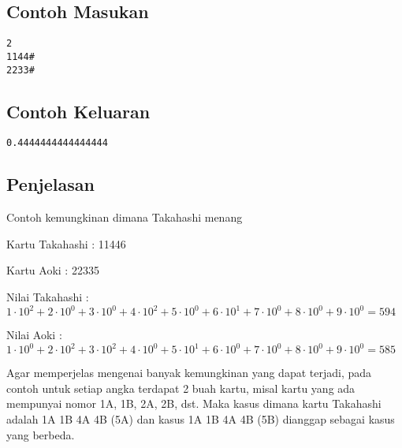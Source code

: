 \documentclass{article}
\begin{document}
\begin{multicols}{2}
\subsection*{Contoh Masukan}
\begin{lstlisting}
2
1144#
2233#
\end{lstlisting}
\columnbreak
\subsection*{Contoh Keluaran}
\begin{lstlisting}
0.4444444444444444
\end{lstlisting}
\vfill
\null
\end{multicols}

\subsection*{Penjelasan}
Contoh kemungkinan dimana Takahashi menang

Kartu Takahashi : 11446

Kartu Aoki : 22335

Nilai Takahashi : $1\cdot 10^2 + 2 \cdot 10^0 + 3\cdot 10^0 + 4\cdot10^2 + 5 \cdot 10^0 + 6 \cdot 10^1 + 7 \cdot 10^0 + 8 \cdot 10^0 + 9 \cdot 10^0 = 594$ 

Nilai Aoki : $1\cdot 10^0 + 2 \cdot 10^2 + 3\cdot 10^2 + 4\cdot10^0 + 5 \cdot 10^1 + 6 \cdot 10^0 + 7 \cdot 10^0 + 8 \cdot 10^0 + 9 \cdot 10^0 = 585$

Agar memperjelas mengenai banyak kemungkinan yang dapat terjadi, pada contoh untuk setiap angka terdapat 2 buah kartu, misal kartu yang ada mempunyai nomor 1A, 1B, 2A, 2B, dst.
Maka kasus dimana kartu Takahashi adalah 1A 1B 4A 4B (5A) dan kasus 1A 1B 4A 4B (5B) dianggap sebagai kasus yang berbeda.

\pagebreak
\end{document}
